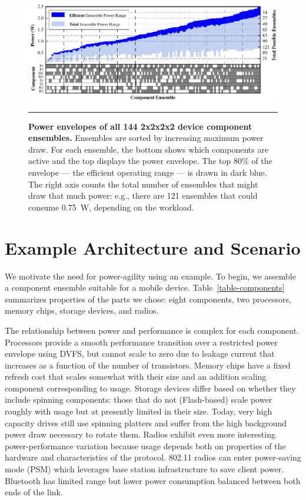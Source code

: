\begin{figure}[t]
\includegraphics{./figures/componentgraph.pdf}

\caption{\small \textbf{Power envelopes of all 144 2x2x2x2 device component
ensembles.} Ensembles are sorted by increasing maximum power draw. For each
ensemble, the bottom shows which components are active and the top displays
the power envelope. The top 80\% of the envelope --- the efficient operating
range --- is drawn in dark blue. The right axis counts the total number of
ensembles that might draw that much power: e.g., there are
121 ensembles that could consume 0.75~W, depending on the workload.}
\vspace{0.10in}
\hrule
\vspace{-0.20in}
\label{figure-componentgraph}
\end{figure}

\section{Example Architecture and Scenario}
\label{section-architectureandscenario}

We motivate the need for power-agility using an example. To begin, we
assemble a component ensemble suitable for a mobile device.
Table~\ref{table-components} summarizes properties of the parts we chose:
eight components, two processors, memory chips, storage devices, and radios.

The relationship between power and performance is complex for each component.
Processors provide a smooth performance transition over a restricted power
envelope using DVFS, but cannot scale to zero due to leakage current that
increases as a function of the number of transistors. Memory chips have a
fixed refresh cost that scales somewhat with their size and an addition
scaling component corresponding to usage. Storage devices differ based on
whether they include spinning components: those that do not (Flash-based)
scale power roughly with usage but at presently limited in their size. Today,
very high capacity drives still use spinning platters and suffer from the
high background power draw necessary to rotate them. Radios exhibit even more
interesting power-performance variation because usage depends both on
properties of the hardware and characteristics of the protocol. 802.11 radios
can enter power-saving mode (PSM) which leverages base station infrastructure
to save client power. Bluetooth has limited range but lower power consumption
balanced between both ends of the link.

